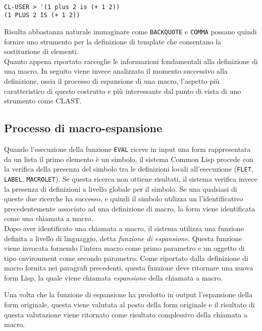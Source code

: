 \begin{lstlisting}

CL-USER > '(1 plus 2 is (+ 1 2))
(1 PLUS 2 IS (+ 1 2))

\end{lstlisting}

Risulta abbastanza naturale immaginare come \texttt{BACKQUOTE} e \texttt{COMMA}
possano quindi fornire uno strumento per la definizione di template che
consentano la sostituzione di elementi.\\

Quanto appena riportato raccoglie le informazioni fondamentali alla definizione
di una macro. In seguito viene invece analizzato il momento successivo alla
definizione, ossia il processo di espansione di una macro, l'aspetto più
caratteristico di questo costrutto e più interessante dal punto di vista di uno
strumento come CLAST.

\subsection{Processo di macro-espansione}
\label{macroexpansion}

Quando l'esecuzione della funzione \texttt{EVAL} riceve in input una form
rappresentata da un lista il primo elemento è un simbolo, il sistema Common Lisp
procede con la verifica della presenza del simbolo tra le definizioni locali
all’esecuzione (\texttt{FLET}, \texttt{LABEL}, \texttt{MACROLET}). Se questa
ricerca non ottiene risultati, il sistema verifica invece la presenza di
definizioni a livello globale per il simbolo. Se una qualsiasi di queste due
ricerche ha successo, e quindi il simbolo utilizza un l’identificativo
precedentemente associato ad una definizione di macro, la form viene
identificata come una chiamata a macro.\\

Dopo aver identificato una chiamata a macro, il sistema utilizza una funzione
definita a livello di linguaggio, detta \textit{funzione di espansione}. Questa
funzione viene invocata fornendo l’intera macro come primo parametro e un
oggetto di tipo environment come secondo parametro. Come riportato dalla
definizione di macro fornita nei paragrafi precedenti, questa funzione deve
ritornare una nuova form Lisp, la quale viene chiamata \textit{espansione} della
chiamata a macro.

Una volta che la funzione di espansione ha prodotto in output l'espansione della
form originale, questa viene valutata al posto della form originale e il
risultato di questa valutazione viene ritornato come risultato complessivo della
chiamata a macro.\\

